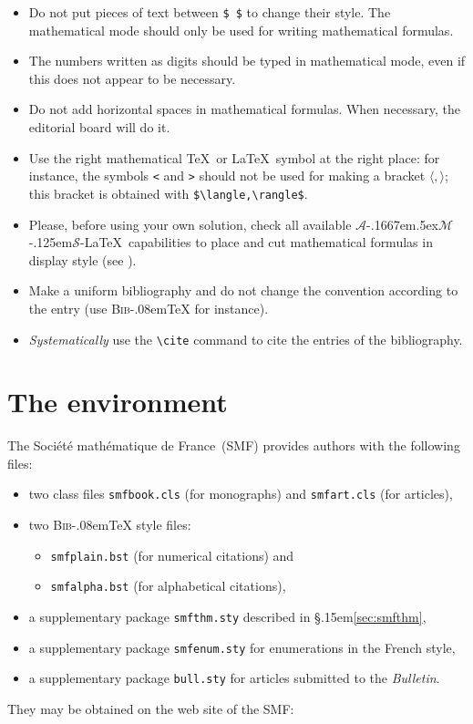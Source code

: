 \documentclass[10 pt,english]{smfart}
\newcommand{\SmF}{Soci\'et\'e ma\-th\'e\-ma\-ti\-que de France}
\newcommand{\BibTeX}{{\scshape Bib}\kern-.08em\TeX}
\newcommand{\T}{\S\kern .15em\relax }
\newcommand{\AMS}{$\mathcal{A}$\kern-.1667em\lower.5ex\hbox
        {$\mathcal{M}$}\kern-.125em$\mathcal{S}$}
\begin{document}

\begin{itemize}
\item
Do not put pieces of text between \verb|$ $| to change their style.
The mathematical mode should only be used for writing mathematical formulas.

\item
The numbers written as digits should be typed in mathematical mode, even if this does not appear to be necessary.

\item
Do not add horizontal spaces in mathematical formulas.
When necessary, the editorial board will do it.

\item
Use the right mathematical \TeX\ or \LaTeX\ symbol at the right place: for instance, the symbols \verb|<| and \verb|>| should not be used for making a bracket $\langle,\rangle$; this bracket is obtained with
\verb|$\langle,\rangle$|.

\item
Please, before using your own solution, check all available \AMS-\LaTeX\ capabilities to place and cut mathematical formulas in display style (see \cite{amslatex}).
\end{itemize}

\begin{itemize}
\item
Make a uniform bibliography and do not change the convention according to the entry (use {\BibTeX} for instance).
\item
{\em Systematically} use the \verb|\cite| command to cite the entries of the bibliography.
\end{itemize}

\section{The environment}

The \SmF\ (SMF) provides authors with the following files:
\begin{itemize}
\item
two class files \texttt{smfbook.cls} (for monographs) and \texttt{smfart.cls} (for articles),
\item
two {\BibTeX} style files:
\begin{itemize}
\item
\texttt{smfplain.bst} (for numerical citations) and 
\item
\texttt{smfalpha.bst} (for alphabetical citations),
\end{itemize}
\item
a supplementary package \texttt{smfthm.sty} described in \T\ref{sec:smfthm},
\item
a supplementary package \texttt{smfenum.sty} for enumerations in the French style,
\item
a supplementary package \texttt{bull.sty} for articles submitted to the \textsl{Bulletin}.
\end{itemize}
They may be obtained on the web site of the SMF:
\end{document}
